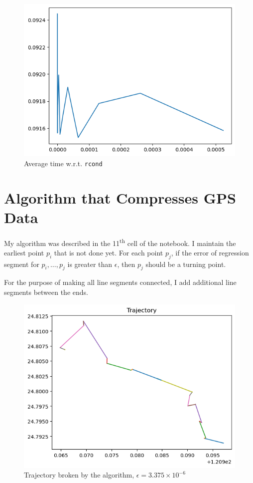 \documentclass[12pt, a4paper]{article}
\begin{document}
\begin{figure}[htbp]
\centering
\includegraphics[width=.87\linewidth]{q2}
\caption{Average time w.r.t. \texttt{rcond}}
\label{fig:q2}
\end{figure}

\section{Algorithm that Compresses GPS Data}

My algorithm was described in the 11\textsuperscript{th} cell of the notebook. I maintain the earliest point $p_i$ that is not done yet. For each point $p_j$, if the error of regression segment for $p_i,\dots,p_j$ is greater than $\epsilon$, then $p_j$ should be a turning point.

For the purpose of making all line segments connected, I add additional line segments between the ends.

\begin{figure}[htbp]
\centering
\includegraphics[width=.87\linewidth]{q3}
\caption{Trajectory broken by the algorithm, $\epsilon=3.375\times10^{-6}$}
\label{fig:q3}
\end{figure}
\end{document}
